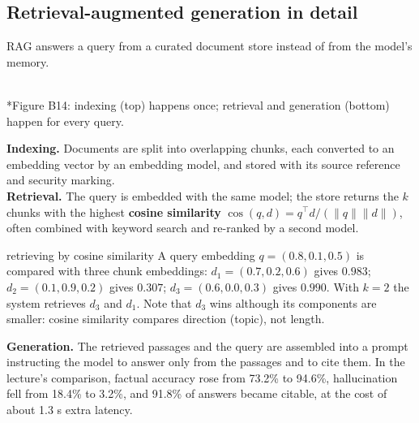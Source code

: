 \documentclass[11pt]{article}
\begin{document}
\subsection{Retrieval-augmented generation in detail}
RAG answers a query from a curated document store instead of from the model's memory.
\begin{center}\\*{\small\color{GreyN}Figure B14: indexing (top) happens once; retrieval and generation (bottom) happen for every query.}\end{center}
\textbf{Indexing.} Documents are split into overlapping chunks, each converted to an embedding vector by an embedding model, and stored with its source reference and security marking.\\
\textbf{Retrieval.} The query is embedded with the same model; the store returns the $k$ chunks with the highest \textbf{cosine similarity} $\cos(q,d)=q^\top d/(\|q\|\|d\|)$, often combined with keyword search and re-ranked by a second model.
\begin{example}{retrieving by cosine similarity}
A query embedding $q=(0.8,0.1,0.5)$ is compared with three chunk embeddings: $d_1=(0.7,0.2,0.6)$ gives $0.983$; $d_2=(0.1,0.9,0.2)$ gives $0.307$; $d_3=(0.6,0.0,0.3)$ gives $0.990$. With $k=2$ the system retrieves $d_3$ and $d_1$. Note that $d_3$ wins although its components are smaller: cosine similarity compares direction (topic), not length.
\end{example}
\textbf{Generation.} The retrieved passages and the query are assembled into a prompt instructing the model to answer only from the passages and to cite them. In the lecture's comparison, factual accuracy rose from 73.2\% to 94.6\%, hallucination fell from 18.4\% to 3.2\%, and 91.8\% of answers became citable, at the cost of about 1.3 s extra latency.
\end{document}
